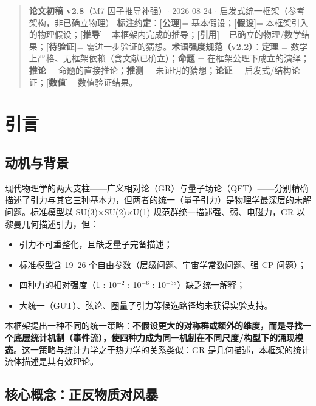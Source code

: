 \documentclass[UTF8,fontset=windows]{csoarticle}
\affil{1} 作者单位，城市　邮编
\affil{1} Author Affiliation, City 000000
\newcommand{\mtag}[1]{\textbf{[#1]}}
\newcommand{\up}[1]{\ensuremath{^{#1}}}
\begin{document}
\maketitle



\begin{quote}
\textbf{论文初稿 v2.8}（M7 因子推导补强）\ensuremath{\cdot} 2026-08-24 \ensuremath{\cdot} 启发式统一框架（参考架构，非已确立物理）
\textbf{标注约定}：\mtag{公理}= 基本假设；\mtag{假设}= 本框架引入的物理假设；\mtag{推导}= 本框架内完成的推导；\mtag{引用}= 已确立的物理/数学结果；\mtag{待验证}= 需进一步验证的猜想。\textbf{术语强度规范（v2.2）}：\textbf{定理} = 数学上严格、无框架依赖（含文献已确立）；\textbf{命题} = 在框架公理下成立的演绎；\textbf{推论} = 命题的直接推论；\textbf{推测} = 未证明的猜想；\textbf{论证} = 启发式/结构论证；\mtag{数值}= 数值验证结果。
\end{quote}


\section{引言}

\subsection{动机与背景}

现代物理学的两大支柱------广义相对论（GR）与量子场论（QFT）------分别精确描述了引力与其它三种基本力，但两者的统一（量子引力）是物理学最深层的未解问题。标准模型以 SU(3)\ensuremath{\times}SU(2)\ensuremath{\times}U(1) 规范群统一描述强、弱、电磁力，GR 以黎曼几何描述引力，但：

\begin{itemize}
\item 引力不可重整化，且缺乏量子完备描述；
\item 标准模型含 19--26 个自由参数（层级问题、宇宙学常数问题、强 CP 问题）；
\item 四种力的相对强度（1 : 10\up{-2} : 10\up{-6} : 10\up{-38}）缺乏统一解释；
\item 大统一（GUT）、弦论、圈量子引力等候选路径均未获得实验支持。
\end{itemize}

本框架提出一种不同的统一策略：\textbf{不假设更大的对称群或额外的维度，而是寻找一个底层统计机制（事件流），使四种力成为同一机制在不同尺度/构型下的涌现模态}。这一策略与统计力学之于热力学的关系类似：GR 是几何描述，本框架的统计流体描述是其有效理论。

\subsection{核心概念：正反物质对风暴}
\end{document}
